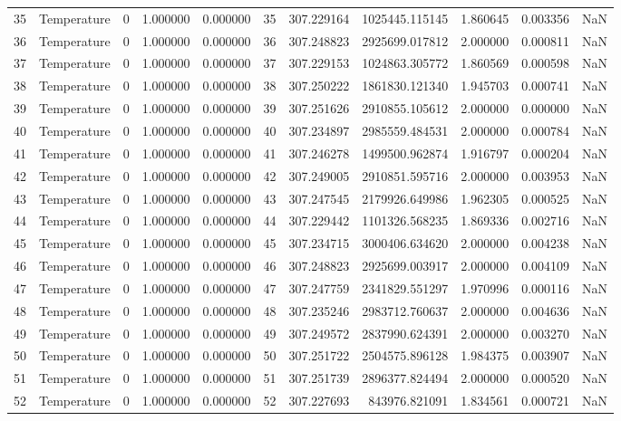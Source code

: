\begin{tabular}{llrrrrrrrrr}
35 & Temperature & 0 & 1.000000 & 0.000000 & 35 & 307.229164 & 1025445.115145 & 1.860645 & 0.003356 & NaN \\
36 & Temperature & 0 & 1.000000 & 0.000000 & 36 & 307.248823 & 2925699.017812 & 2.000000 & 0.000811 & NaN \\
37 & Temperature & 0 & 1.000000 & 0.000000 & 37 & 307.229153 & 1024863.305772 & 1.860569 & 0.000598 & NaN \\
38 & Temperature & 0 & 1.000000 & 0.000000 & 38 & 307.250222 & 1861830.121340 & 1.945703 & 0.000741 & NaN \\
39 & Temperature & 0 & 1.000000 & 0.000000 & 39 & 307.251626 & 2910855.105612 & 2.000000 & 0.000000 & NaN \\
40 & Temperature & 0 & 1.000000 & 0.000000 & 40 & 307.234897 & 2985559.484531 & 2.000000 & 0.000784 & NaN \\
41 & Temperature & 0 & 1.000000 & 0.000000 & 41 & 307.246278 & 1499500.962874 & 1.916797 & 0.000204 & NaN \\
42 & Temperature & 0 & 1.000000 & 0.000000 & 42 & 307.249005 & 2910851.595716 & 2.000000 & 0.003953 & NaN \\
43 & Temperature & 0 & 1.000000 & 0.000000 & 43 & 307.247545 & 2179926.649986 & 1.962305 & 0.000525 & NaN \\
44 & Temperature & 0 & 1.000000 & 0.000000 & 44 & 307.229442 & 1101326.568235 & 1.869336 & 0.002716 & NaN \\
45 & Temperature & 0 & 1.000000 & 0.000000 & 45 & 307.234715 & 3000406.634620 & 2.000000 & 0.004238 & NaN \\
46 & Temperature & 0 & 1.000000 & 0.000000 & 46 & 307.248823 & 2925699.003917 & 2.000000 & 0.004109 & NaN \\
47 & Temperature & 0 & 1.000000 & 0.000000 & 47 & 307.247759 & 2341829.551297 & 1.970996 & 0.000116 & NaN \\
48 & Temperature & 0 & 1.000000 & 0.000000 & 48 & 307.235246 & 2983712.760637 & 2.000000 & 0.004636 & NaN \\
49 & Temperature & 0 & 1.000000 & 0.000000 & 49 & 307.249572 & 2837990.624391 & 2.000000 & 0.003270 & NaN \\
50 & Temperature & 0 & 1.000000 & 0.000000 & 50 & 307.251722 & 2504575.896128 & 1.984375 & 0.003907 & NaN \\
51 & Temperature & 0 & 1.000000 & 0.000000 & 51 & 307.251739 & 2896377.824494 & 2.000000 & 0.000520 & NaN \\
52 & Temperature & 0 & 1.000000 & 0.000000 & 52 & 307.227693 & 843976.821091 & 1.834561 & 0.000721 & NaN \\

\end{tabular}
